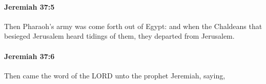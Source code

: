 		\paragraph{Jeremiah 37:5} %
			\label{JEREMIAH-37-5}

			Then Pharaoh’s army was come forth out of Egypt: and when the Chaldeans that besieged Jerusalem heard tidings of them, they departed from Jerusalem.


		\paragraph{Jeremiah 37:6} %
			\label{JEREMIAH-37-6}

			Then came the word of the LORD unto the prophet Jeremiah, saying,


